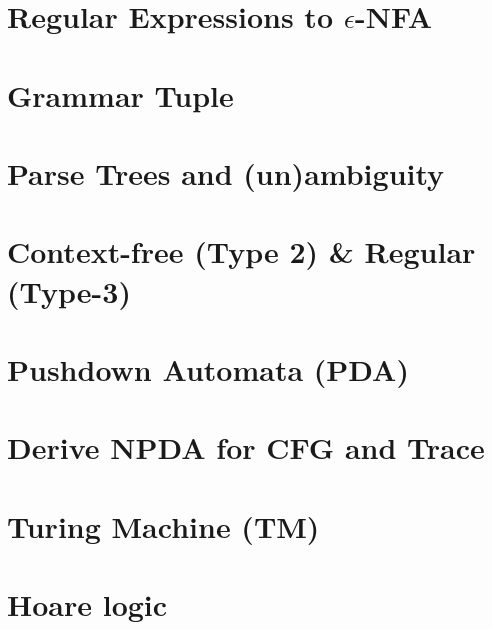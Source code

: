 \documentclass[10pt,a4paper,landscape]{article}
\begin{document}
\begin{multicols*}{3}
\section*{Regular Expressions to $\epsilon$-NFA}
\vspace{-1em}


\section*{Grammar Tuple}
\vspace{-0.3em}


\section*{Parse Trees and (un)ambiguity}
\vspace{-0.3em}


\section*{Context-free (Type 2) \& Regular (Type-3)}
\vspace{-0.6em}


\section*{Pushdown Automata (PDA)}


\section*{Derive NPDA for CFG and Trace}
\vspace{-0.6em}


\section*{Turing Machine (TM)}
\vspace{-0.5em}



\section*{Hoare logic}

\end{multicols*}
\end{document}
